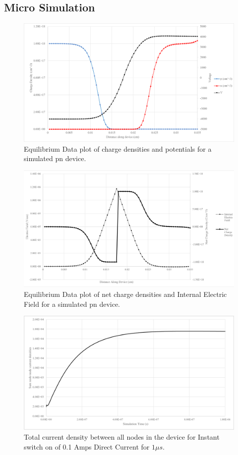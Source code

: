 \documentclass[titlepage]{article}
\begin{document}
\subsection{Micro Simulation}

\begin{figure}[H]
	\centering
	\includegraphics[scale=0.6]{Figures/035mm80n18_eqm_Graph1}
	\caption{Equilibrium Data plot of charge densities and potentials for a simulated pn device.\label{res:Mic:G1}}
\end{figure}
\begin{figure}[H]
	\centering
	\includegraphics[scale=0.6]{Figures/035mm80n18_eqm_Graph2.png}
	\caption{Equilibrium Data plot of net charge densities and Internal Electric Field for a simulated pn device.\label{res:Mic:G2}}
\end{figure}
\begin{figure}[H]
	\centering
	\includegraphics[scale=0.4]{Figures/FINAL_JSIM_100mA_1e-6_1e-9_Graph.png}
	\caption{Total current density between all nodes in the device for Instant switch on of 0.1 Amps Direct Current for $1\mu s$.\label{res:Mic:G2}}
\end{figure}
\end{document}
